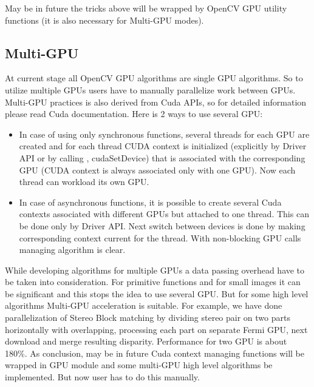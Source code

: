 May be in future the tricks above will be wrapped by OpenCV GPU utility functions (it is also necessary for Multi-GPU modes).

\subsection{Multi-GPU}

At current stage all OpenCV GPU algorithms are single GPU algorithms. So to utilize multiple GPUs users have to manually parallelize work between GPUs. Multi-GPU practices is also derived from Cuda APIs, so for detailed information please read Cuda documentation. Here is 2 ways to use several GPU:
\begin{itemize}
\item In case of using only synchronous functions, several threads for each GPU are created and for each thread CUDA context is initialized (explicitly by Driver API or by calling \newline {}, cudaSetDevice) that is associated with the corresponding GPU (CUDA context is always associated only with one GPU).  Now each thread can workload its own GPU.
\item In case of asynchronous functions, it is possible to create several Cuda contexts associated with different GPUs but attached to one thread. This can be done only by Driver API. Next switch between devices is done by making corresponding context current for the thread. With non-blocking GPU calls managing algorithm is clear.
\end{itemize}
While developing algorithms for multiple GPUs a data passing overhead have to be taken into consideration. For primitive functions and for small images it can be significant and this stops the idea to use several GPU. But for some high level algorithms Multi-GPU acceleration is suitable. For example, we have done parallelization of Stereo Block matching by dividing stereo pair on two parts horizontally with overlapping, processing each part on separate Fermi GPU, next download and merge resulting disparity. Performance for two GPU is about 180\%. As conclusion, may be in future Cuda context managing functions will be wrapped in GPU module and some multi-GPU high level algorithms be implemented. But now user has to do this manually.


